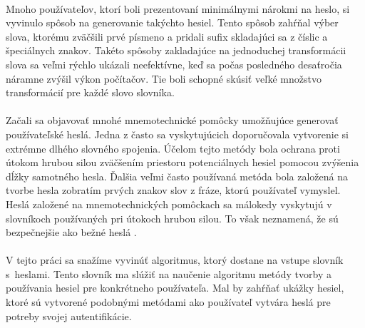 \paragraph{}
Mnoho používateľov, ktorí boli prezentovaní minimálnymi nárokmi na heslo, si vyvinulo spôsob na generovanie takýchto hesiel. Tento spôsob zahŕňal výber slova, ktorému zväčšili prvé písmeno a pridali sufix skladajúci sa z číslic a špeciálnych znakov. Takéto spôsoby zakladajúce na jednoduchej transformácii slova sa veľmi rýchlo ukázali neefektívne, keď sa počas posledného desaťročia náramne zvýšil výkon počítačov. Tie boli schopné skúsiť veľké množstvo transformácií pre každé slovo slovníka.

\paragraph{}
Začali sa objavovať mnohé mnemotechnické pomôcky umožňujúce generovať používateľské heslá. Jedna z často sa vyskytujúcich doporučovala vytvorenie si extrémne dlhého slovného spojenia. Účelom tejto metódy bola ochrana proti útokom hrubou silou zväčšením priestoru potenciálnych hesiel pomocou zvýšenia dĺžky samotného hesla. Ďalšia veľmi často používaná metóda bola založená na tvorbe hesla zobratím prvých znakov slov z fráze, ktorú používateľ vymyslel. Heslá založené na mnemotechnických pomôckach sa málokedy vyskytujú v slovníkoch používaných pri útokoch hrubou silou. To však neznamená, že sú bezpečnejšie ako bežné heslá \cite{Kuo:2006:HSM:1143120.1143129}.

\paragraph{}
V tejto práci sa snažíme vyvinúť algoritmus, ktorý dostane na vstupe slovník s~heslami. Tento slovník ma slúžiť na naučenie algoritmu metódy tvorby a používania hesiel pre konkrétneho používateľa. Mal by zahŕňať ukážky hesiel, ktoré sú vytvorené podobnými metódami ako používateľ vytvára heslá pre potreby svojej autentifikácie.